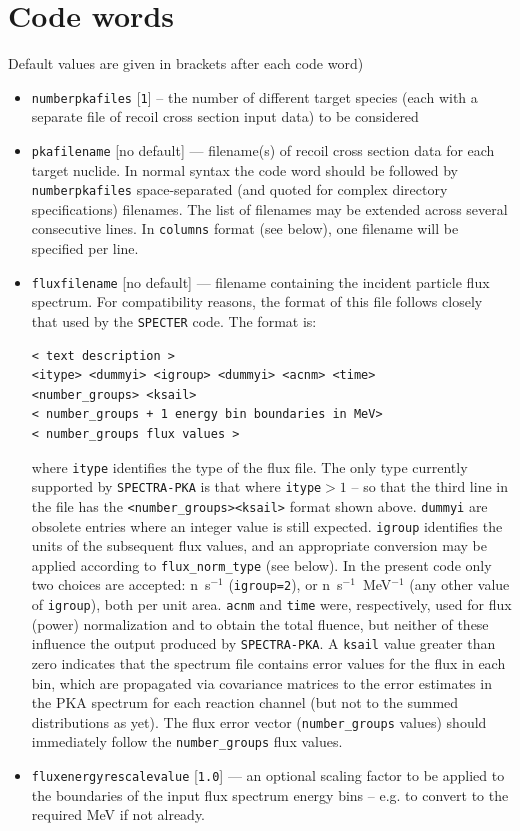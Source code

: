 \documentclass[a4paper]{article}
\begin{document}
\section{Code words}
Default values are given in brackets after each code word)
\begin{itemize}


\item \texttt{number{\textunderscore}pka{\textunderscore}files} [\texttt{1}] -- the number of different target species (each with a separate file of recoil cross section input data) to be considered
\item \texttt{pka{\textunderscore}filename} [no default] --- filename(s) of recoil cross section data for each target nuclide. In normal syntax the code word should be followed by \texttt{number{\textunderscore}pka{\textunderscore}files} space-separated (and quoted for complex directory specifications) filenames. The list of filenames may be extended across several consecutive lines. In \texttt{columns} format (see below), one filename will be specified per line.
\item \texttt{flux{\textunderscore}filename} [no default] --- filename containing the incident particle flux spectrum. For compatibility reasons, the format of this file follows closely that used by the \texttt{SPECTER} code. The format is:\\
    \begin{verbatim}
< text description >
<itype> <dummyi> <igroup> <dummyi> <acnm> <time>
<number_groups> <ksail>
< number_groups + 1 energy bin boundaries in MeV>
< number_groups flux values >
    \end{verbatim}
    where \texttt{itype} identifies the type of the flux file. The only type currently supported by \texttt{SPECTRA-PKA} is that where \texttt{itype}\(>1\) -- so that the third line in the file has the \verb|<number_groups><ksail>| format shown above. \texttt{dummyi} are obsolete entries where an integer value is still expected. \texttt{igroup} identifies the units of the subsequent flux values, and an appropriate conversion may be applied according to \verb|flux_norm_type| (see below). In the present code only two choices are accepted: n~s\(^{-1}\) (\texttt{igroup=2}), or n~s\(^{-1}\)~MeV\(^{-1}\) (any other value of \texttt{igroup}), both per unit area. \texttt{acnm} and \texttt{time} were, respectively, used for flux (power) normalization and to obtain the total fluence, but neither of these influence the output produced by \texttt{SPECTRA-PKA}. A \texttt{ksail} value greater than zero indicates that the spectrum file contains error values for the flux in each bin, which are propagated via covariance matrices to the error estimates in the PKA spectrum for each reaction channel (but not to the summed distributions as yet). The flux error vector (\verb|number_groups| values) should immediately follow the \verb|number_groups| flux values.
\item \texttt{flux{\textunderscore}energy{\textunderscore}rescale{\textunderscore}value} [\texttt{1.0}] --- an optional scaling factor to be applied to the boundaries of the input flux spectrum energy bins -- e.g. to convert to the required MeV if not already.


\end{itemize}
\end{document}
